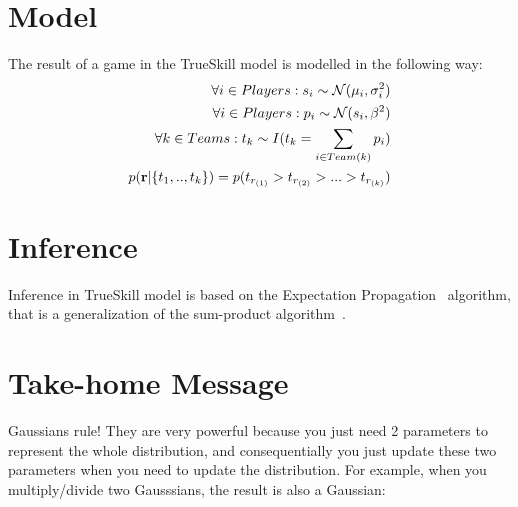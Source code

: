 \documentclass[12pt]{article}
\begin{document}
\section{Model}
The result of a game in the TrueSkill model is modelled in the following way:
\begin{align}
\forall i \in Players: s_i \sim \mathcal{N}(\mu_i, \sigma^2_i) \\
\forall i \in Players: p_i \sim \mathcal{N}(s_i, \beta^2) \\
\forall k \in Teams: t_k \sim I(t_k=\sum_{i \in Team(k)} p_i) \\
p(\mathbf{r}|\{t_1, .., t_k\}) = p(t_{r_{(1)}}>t_{r_{(2)}}> ... > t_{r_{(k)}}) \\
\end{align}

\section{Inference}
Inference in TrueSkill model is based on the Expectation Propagation~\cite{minka2001expectation} algorithm, that is a generalization of the sum-product algorithm~\cite{kschischang2001factor}.

\section{Take-home Message}

Gaussians rule! They are very powerful because you just need 2 parameters to represent the whole distribution, and consequentially you just update these two parameters when you need to update the distribution. For example, when you multiply/divide two Gausssians, the result is also a Gaussian:
\end{document}
